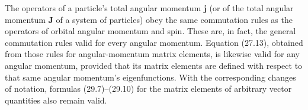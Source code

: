 The operators of a particle's total angular momentum $\mathbf j$ (or of the
total angular momentum $\mathbf J$ of a system of particles) obey the same
commutation rules as the operators of orbital angular momentum and spin. These
are, in fact, the general commutation rules valid for every angular momentum.
Equation (27.13), obtained from those rules for angular-momentum matrix
elements, is likewise valid for any angular momentum, provided that its matrix
elements are defined with respect to that same angular momentum's
eigenfunctions. With the corresponding changes of notation, formulas
(29.7)--(29.10) for the matrix elements of arbitrary vector quantities also
remain valid.
